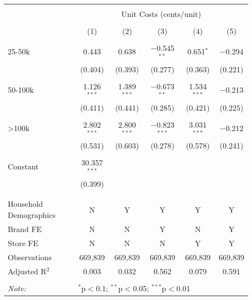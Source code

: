 
\begin{table}[!htbp] \centering 
  \caption{} 
  \label{} 
\begin{tabular}{@{\extracolsep{5pt}}lccccc} 
\\[-1.8ex]\hline 
\hline \\[-1.8ex] 
 & \multicolumn{5}{c}{Unit Costs (cents/unit)} \\ 
\cline{2-6} 
\\[-1.8ex] & (1) & (2) & (3) & (4) & (5)\\ 
\hline \\[-1.8ex] 
 25-50k & 0.443 & 0.638 & $-$0.545$^{**}$ & 0.651$^{*}$ & $-$0.294 \\ 
  & (0.404) & (0.393) & (0.277) & (0.363) & (0.221) \\ 
  & & & & & \\ 
 50-100k & 1.126$^{***}$ & 1.389$^{***}$ & $-$0.673$^{**}$ & 1.534$^{***}$ & $-$0.213 \\ 
  & (0.411) & (0.441) & (0.285) & (0.421) & (0.225) \\ 
  & & & & & \\ 
 >100k & 2.802$^{***}$ & 2.800$^{***}$ & $-$0.823$^{***}$ & 3.031$^{***}$ & $-$0.212 \\ 
  & (0.531) & (0.603) & (0.278) & (0.578) & (0.241) \\ 
  & & & & & \\ 
 Constant & 30.357$^{***}$ &  &  &  &  \\ 
  & (0.399) &  &  &  &  \\ 
  & & & & & \\ 
\hline \\[-1.8ex] 
Household Demographics & N & Y & Y & Y & Y \\ 
Brand FE & N & N & Y & N & Y \\ 
Store FE & N & N & N & Y & Y \\ 
Observations & 669,839 & 669,839 & 669,839 & 669,839 & 669,839 \\ 
Adjusted R$^{2}$ & 0.003 & 0.032 & 0.562 & 0.079 & 0.591 \\ 
\hline 
\hline \\[-1.8ex] 
\textit{Note:}  & \multicolumn{5}{l}{$^{*}$p$<$0.1; $^{**}$p$<$0.05; $^{***}$p$<$0.01} \\ 
\end{tabular} 
\end{table} 
